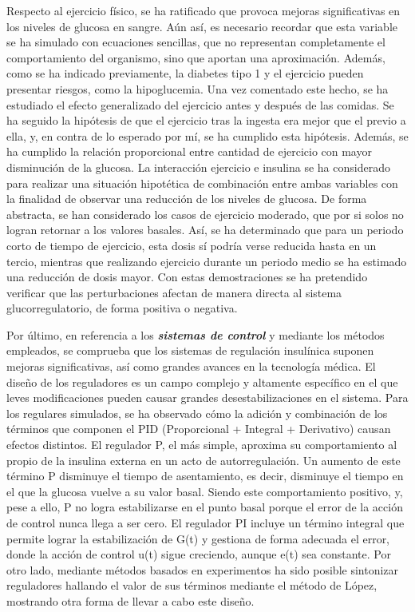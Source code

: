 Respecto al ejercicio físico, se ha ratificado que provoca mejoras significativas en los niveles de glucosa en sangre. Aún así, es necesario recordar que esta variable se ha simulado con ecuaciones sencillas, que no representan completamente el comportamiento del organismo, sino que aportan una aproximación. Además, como se ha indicado previamente, la diabetes tipo 1 y el ejercicio pueden presentar riesgos, como la hipoglucemia. Una vez comentado este hecho, se ha estudiado el efecto generalizado del ejercicio antes y después de las comidas. Se ha seguido la hipótesis de que el ejercicio tras la ingesta era mejor que el previo a ella, y, en contra de lo esperado por mí, se ha cumplido esta hipótesis. Además, se ha cumplido la relación proporcional entre cantidad de ejercicio con mayor disminución de la glucosa. La interacción ejercicio e insulina se ha considerado para realizar una situación hipotética de combinación entre ambas variables con la finalidad de observar una reducción de los niveles de glucosa. De forma abstracta, se han considerado los casos de ejercicio moderado, que por si solos no logran retornar a los valores basales. Así, se ha determinado que para un periodo corto de tiempo de ejercicio, esta dosis sí podría verse reducida hasta en un tercio, mientras que realizando ejercicio durante un periodo medio se ha estimado una reducción de dosis mayor. Con estas demostraciones se ha pretendido verificar que las perturbaciones afectan de manera directa al sistema glucorregulatorio, de forma positiva o negativa.

Por último, en referencia a los \textit{\textbf{sistemas de control}} y mediante los métodos empleados, se comprueba que los sistemas de regulación insulínica suponen mejoras significativas, así como grandes avances en la tecnología médica. El diseño de los reguladores es un campo complejo y altamente específico en el que leves modificaciones pueden causar grandes desestabilizaciones en el sistema. Para los regulares simulados, se ha observado cómo la adición y combinación de los términos que componen el PID (Proporcional + Integral + Derivativo) causan efectos distintos. El regulador P, el más simple, aproxima su comportamiento al propio de la insulina externa en un acto de autorregulación. Un aumento de este término P disminuye el tiempo de asentamiento, es decir, disminuye el tiempo en el que la glucosa vuelve a su valor basal. Siendo este comportamiento positivo, y, pese a ello, P no logra estabilizarse en el punto basal porque el error de la acción de control nunca llega a ser cero. El regulador PI incluye un término integral que permite lograr la estabilización de G(t) y gestiona de forma adecuada el error, donde la acción de control u(t) sigue creciendo, aunque e(t) sea constante. Por otro lado, mediante métodos basados en experimentos ha sido posible sintonizar reguladores hallando el valor de sus términos mediante el método de López, mostrando otra forma de llevar a cabo este diseño. 

